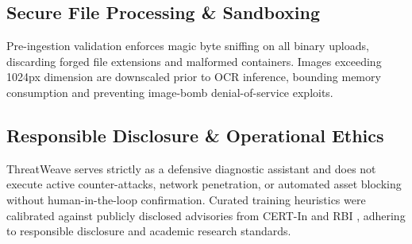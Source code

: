 \documentclass[conference]{IEEEtran}
\begin{document}
\subsection{Secure File Processing \& Sandboxing}
Pre-ingestion validation enforces magic byte sniffing on all binary uploads, discarding forged file extensions and malformed containers. Images exceeding 1024px dimension are downscaled prior to OCR inference, bounding memory consumption and preventing image-bomb denial-of-service exploits.

\subsection{Responsible Disclosure \& Operational Ethics}
ThreatWeave serves strictly as a defensive diagnostic assistant and does not execute active counter-attacks, network penetration, or automated asset blocking without human-in-the-loop confirmation. Curated training heuristics were calibrated against publicly disclosed advisories from CERT-In and RBI \cite{rbi2021security, certin2024annual}, adhering to responsible disclosure and academic research standards.
\end{document}

